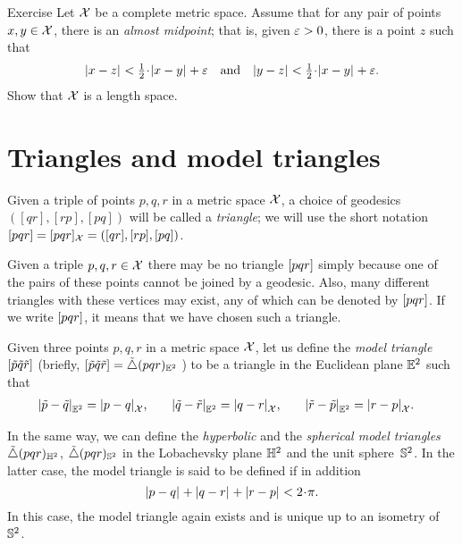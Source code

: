 \begin{thm}{Exercise}\label{ex:menger}
Let $\mathcal{X}$ be a complete metric space.
Assume that for any pair of points $x,y\in \mathcal{X}$, 
there is an \emph{almost midpoint};
that is, given $\varepsilon>0$, there is a point $z$ such that 
\[\dist{x}{z}{}<\tfrac12\cdot\dist{x}{y}{}+\eps 
\quad\text{and}\quad
\dist{y}{z}{}<\tfrac12\cdot\dist{x}{y}{}+\eps.\]
Show that $\mathcal{X}$ is a length space.
\end{thm}


\section{Triangles and model triangles}

Given a triple of points $p,q,r$ in a metric space $\mathcal{X}$, a choice of geodesics $([q r], [r p], [p q])$ will be called a \emph{triangle}; we will use the short notation
$[pqr]=[pqr]_{\mathcal{X}}=([q r], [r p], [p q])$.

Given a triple $p,q,r\in \mathcal{X}$ there may be no triangle 
$[pqr]$ simply because one of the pairs of these points cannot be joined by a geodesic.
Also, many different triangles with these vertices may exist, any of which can be denoted by $[pqr]$.
If we write $[pqr]$, it means that we have chosen such a triangle.


Given three points $p,q,r$ in a metric space $\mathcal{X}$,
let us define the \emph{model triangle} $[\tilde p\tilde q\tilde r]$ 
(briefly, 
$[\tilde p\tilde q\tilde r]=\tilde\triangle(p q r)_{\mathbb{E}^2}$%
) to be a triangle in the Euclidean plane $\mathbb{E}^2$ such that
\begin{align*}|{\tilde p}-{\tilde q}|_{\mathbb{E}^2}^{{}}&=|{p}-{q}|_{\mathcal{X}}^{{}},
&
\quad|{\tilde q}-{\tilde r}|_{\mathbb{E}^2}^{{}}&=|{q}-{r}|_{\mathcal{X}}^{{}},
&
\quad|{\tilde r}-{\tilde p}|_{\mathbb{E}^2}^{{}}&=|{r}-{p}|_{\mathcal{X}}^{{}}.
\end{align*}

In the same way, we can define the \emph{hyperbolic} and the \emph{spherical model triangles} $\tilde\triangle(p q r)_{\mathbb{H}^2}$, $\tilde\triangle(p q r)_{\mathbb{S}^2}$
in the Lobachevsky plane $\mathbb{H}^2$ and the unit sphere~$\mathbb{S}^2$.
In the latter case, the model triangle is said to be defined if in addition
\[\dist{p}{q}{}+\dist{q}{r}{}+\dist{r}{p}{}< 2\cdot\pi.\]
In this case, the model triangle again exists and is unique up to an isometry of~$\mathbb{S}^2$.

